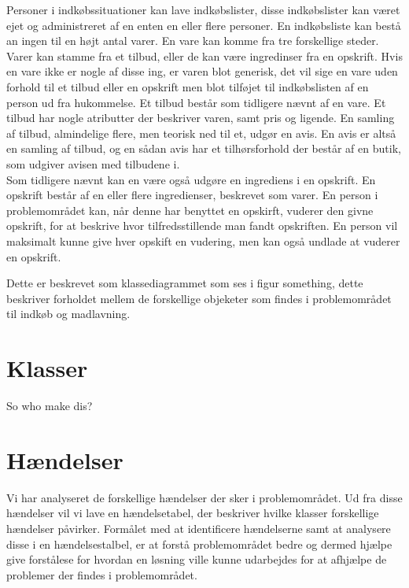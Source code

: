 Personer i indkøbssituationer kan lave indkøbslister, disse indkøbslister kan været ejet og administreret af en enten en eller flere personer. 
En indkøbsliste kan bestå an ingen til en højt antal varer.
En vare kan komme fra tre forskellige steder.
Varer kan stamme fra et tilbud, eller de kan være ingredinser fra en opskrift. 
Hvis en vare ikke er nogle af disse ing, er varen blot generisk, det vil sige en vare uden forhold til et tilbud eller en opskrift men blot tilføjet til indkøbslisten af en person ud fra hukommelse.
Et tilbud består som tidligere nævnt af en vare.
Et tilbud har nogle atributter der beskriver varen, samt pris og ligende.
En samling af tilbud, almindelige flere, men teorisk ned til et, udgør en avis. 
En avis er altså en samling af tilbud, og en sådan avis har et tilhørsforhold der består af en butik, som udgiver avisen med tilbudene i.\\
Som tidligere nævnt kan en være også udgøre en ingrediens i en opskrift.
En opskrift består af en eller flere ingredienser, beskrevet som varer.
En person i problemområdet kan, når denne har benyttet en opskirft, vuderer den givne opskrift, for at beskrive hvor tilfredsstillende man fandt opskriften.
En person vil maksimalt kunne give hver opskift en vudering, men kan også undlade at vuderer en opskrift.

Dette er beskrevet som klassediagrammet som ses i figur something, dette beskriver forholdet mellem de forskellige objeketer som findes i problemområdet til indkøb og madlavning.

\section{Klasser}
So who make dis?

\section{Hændelser}
Vi har analyseret de forskellige hændelser der sker i problemområdet. 
Ud fra disse hændelser vil vi lave en hændelsetabel, der beskriver hvilke klasser forskellige hændelser påvirker.
Formålet med at identificere hændelserne samt at analysere disse i en hændelsestalbel, er at forstå problemområdet bedre og dermed hjælpe give forstålese for hvordan en løsning ville kunne udarbejdes for at afhjælpe de problemer der findes i problemområdet.



